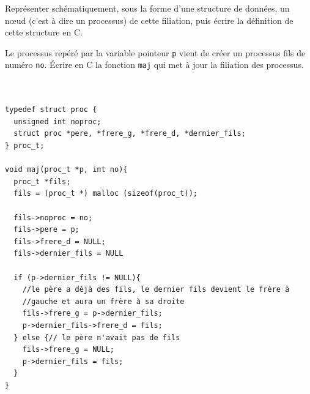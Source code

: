 \documentclass[10pt]{article}\usepackage[nu,correction]{esial}
\begin{document}
\Question Représenter schématiquement, sous la forme d'une structure
de données, un n\oe ud (c'est à dire un processus) de cette filiation,
puis écrire la définition de cette structure en C.

\Question Le processus repéré par la variable pointeur {\tt p} vient
de créer un processus fils de numéro {\tt no}.  Écrire en C la
fonction {\tt maj} qui met à jour la filiation des processus.

\begin{Reponse}
\vspace{-.7cm}
\begin{verbatim}


typedef struct proc {
  unsigned int noproc;
  struct proc *pere, *frere_g, *frere_d, *dernier_fils;
} proc_t;

void maj(proc_t *p, int no){
  proc_t *fils;
  fils = (proc_t *) malloc (sizeof(proc_t));

  fils->noproc = no;
  fils->pere = p;
  fils->frere_d = NULL;
  fils->dernier_fils = NULL 

  if (p->dernier_fils != NULL){
    //le père a déjà des fils, le dernier fils devient le frère à
    //gauche et aura un frère à sa droite
    fils->frere_g = p->dernier_fils;
    p->dernier_fils->frere_d = fils;
  } else {// le père n'avait pas de fils
    fils->frere_g = NULL;
    p->dernier_fils = fils;
  } 
}
\end{verbatim}
~
\end{Reponse}
\end{document}

